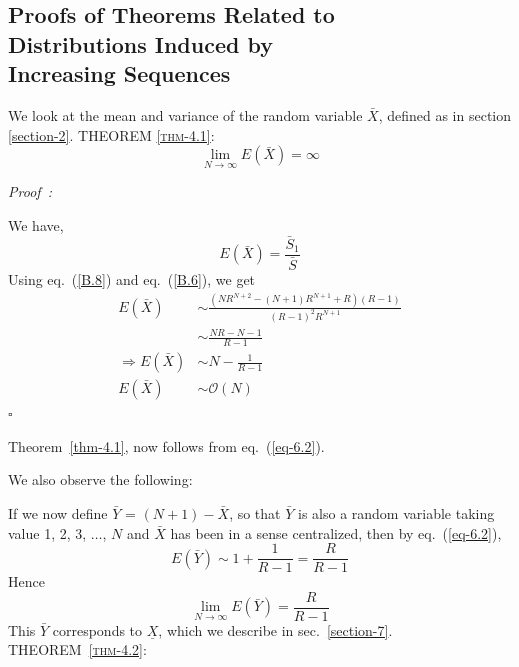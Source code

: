 \begin{multicols}{2}
\vspace{-.3cm}

\section{Proofs of Theorems Related to\\ Distributions Induced by\\ Increasing Sequences}\label{section-6}

\vspace{-.2cm}

We look at the mean and variance of the random variable $\bar{X}$, defined as in section \ref{section-2}. \textsc{THEOREM {\ref{thm-4.1}}:}
\begin{equation*}
\displaystyle{\lim_{N \rightarrow \infty}} E(\bar{X}) = \infty  
 \end{equation*}

\noindent
{\it Proof~:}

We have,
\begin{equation}
E(\bar{X}) = \frac{\bar{S}_1}{\bar{S}}\label{eq-6.1}
\end{equation}
Using eq.~(\ref{B.8}) and eq.~(\ref{B.6}), we get
\begin{align}
E(\bar{X})&\sim \frac{(NR^{N+2}-(N+1)R^{N+1}+R)(R-1)}{(R-1)^2 R^{N+1}}\nonumber\\
&\sim \frac{NR-N-1}{R-1}\nonumber\\
\Rightarrow E(\bar{X}) &\sim N - \frac{1}{R-1}\label{eq-6.2}\\
\nonumber E(\bar{X}) &\sim \mathcal{O}(N)
\end{align}\hfill{$\square$\\}


\vspace{-.7cm}

Theorem~\ref{thm-4.1}, now follows from eq.~(\ref{eq-6.2}).

We also observe the following: 

 If we now define $\bar Y$ = $(N+1)- \bar{X}$, so that $\bar{Y}$ is also a random variable taking value 1, 2, 3, $\ldots$, $N$ and $\bar{X}$ has been in a sense centralized, then by eq.~(\ref{eq-6.2}),
 \begin{equation*}
 E(\bar{Y}) \sim 1 + \frac{1}{R-1} = \frac{R}{R-1}
 \end{equation*}
Hence 
\begin{equation*}
\displaystyle{\lim_{N \rightarrow \infty}} E(\bar{Y}) = \frac{R}{R-1} 
\end{equation*}
This $\bar{Y}$ corresponds to $\underline{X}$, which we describe in sec.~\ref{section-7}.\\
\textsc{THEOREM~{\ref{thm-4.2}}:}


\end{multicols}
